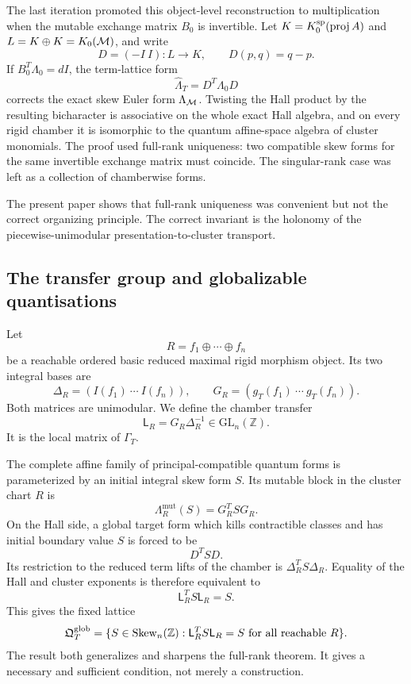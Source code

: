 The last iteration promoted this object-level reconstruction to
multiplication when the mutable exchange matrix $B_0$ is invertible.  Let
$K=K_0^{\mathrm{sp}}(\operatorname{proj} A)$ and
$L=K\oplus K=K_0(\mathcal M)$, and write
\[
 D=(-I\ I):L\longrightarrow K,
 \qquad D(p,q)=q-p.
\]
If $B_0^T\Lambda_0=dI$, the term-lattice form
\[
 \widehat\Lambda_T=D^T\Lambda_0D
\]
corrects the exact skew Euler form $\Lambda_{\mathcal M}$.  Twisting the Hall product
by the resulting bicharacter is associative on the whole exact Hall algebra,
and on every rigid chamber it is isomorphic to the quantum affine-space
algebra of cluster monomials.  The proof used full-rank uniqueness: two
compatible skew forms for the same invertible exchange matrix must coincide.
The singular-rank case was left as a collection of chamberwise forms.

The present paper shows that full-rank uniqueness was convenient but not the
correct organizing principle.  The correct invariant is the holonomy of the
piecewise-unimodular presentation-to-cluster transport.

\subsection*{The transfer group and globalizable quantisations}

Let
\[
 R=f_1\oplus\cdots\oplus f_n
\]
be a reachable ordered basic reduced maximal rigid morphism object.  Its two
integral bases are
\[
 \Delta_R=(I(f_1)\ \cdots\ I(f_n)),
 \qquad
 G_R=(g_T(f_1)\ \cdots\ g_T(f_n)).
\]
Both matrices are unimodular.  We define the chamber transfer
\[
 \mathsf L_R=G_R\Delta_R^{-1}\in\mathrm{GL}_n(\mathbb Z).
\]
It is the local matrix of $\Gamma_T$.

The complete affine family of principal-compatible quantum forms is
parameterized by an initial integral skew form $S$.  Its mutable block in the
cluster chart $R$ is
\[
 \Lambda_R^{\mathrm{mut}}(S)=G_R^TSG_R.
\]
On the Hall side, a global target form which kills contractible classes and
has initial boundary value $S$ is forced to be
\[
 D^TSD.
\]
Its restriction to the reduced term lifts of the chamber is
$\Delta_R^TS\Delta_R$.  Equality of the Hall and cluster exponents is
therefore equivalent to
\[
 \mathsf L_R^TS\mathsf L_R=S.
\]
This gives the fixed lattice
\[
 \mathfrak Q^{\mathrm{glob}}_T
 =\{S\in\operatorname{Skew}_n(\mathbb Z):
       \mathsf L_R^TS\mathsf L_R=S\text{ for all reachable }R\}.
\]
The result both generalizes and sharpens the full-rank theorem.  It gives a
necessary and sufficient condition, not merely a construction.

